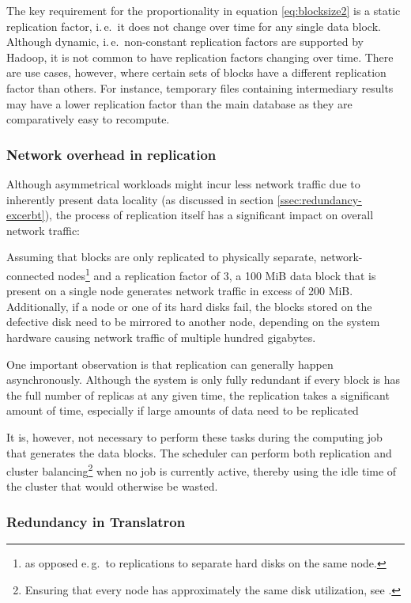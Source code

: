 \documentclass[a4paper, 12pt, twoside, reqn]{report}
\numberwithin{figure}{chapter}
\newtheorem[L]{boxedDefinition}{Definition}
\newtheorem[L]{boxedExample}{Example}
\newcommand{\ie}{i.\,e.\ }
\newcommand{\eg}{e.\,g.\ }
\begin{document}
The key requirement for the proportionality in equation \eqref{eq:blocksize2} is a static replication factor, \ie it does not change over time for any single data block.
Although dynamic, \ie non-constant replication factors are supported by Hadoop, it is not common to have replication factors changing over time. There are use cases, however, where certain sets of blocks have a different replication factor than others. For instance, temporary files containing intermediary results may have a lower replication factor than the main database as they are comparatively easy to recompute.

\subsubsection{Network overhead in replication}\label{sssec:replication-network-overhead}

Although asymmetrical workloads might incur less network traffic due to inherently present data locality (as discussed in section \ref{ssec:redundancy-excerbt}), the process of replication itself has a significant impact on overall network traffic:

Assuming that blocks are only replicated to physically separate, network-connected nodes\footnote{as opposed \eg to replications to separate hard disks on the same node.} and a replication factor of 3, a 100 MiB data block that is present on a single node generates network traffic in excess of 200 MiB. Additionally, if a node or one of its hard disks fail, the blocks stored on the defective disk need to be mirrored to another node, depending on the system hardware causing network traffic of multiple hundred gigabytes.

One important observation is that replication can generally happen asynchronously. Although the system is only fully redundant if every block is has the full number of replicas at any given time, the replication takes a significant amount of time, especially if large amounts of data need to be replicated

It is, however, not necessary to perform these tasks during the computing job that generates the data blocks. The scheduler can perform both replication and cluster balancing\footnote{Ensuring that every node has approximately the same disk utilization, see \cite[section 7]{white2009hadoop}.} when no job is currently active, thereby using the idle time of the cluster that would otherwise be wasted.

\subsubsection{Redundancy in Translatron}\label{sssec:redundancy-translatron}
\end{document}
